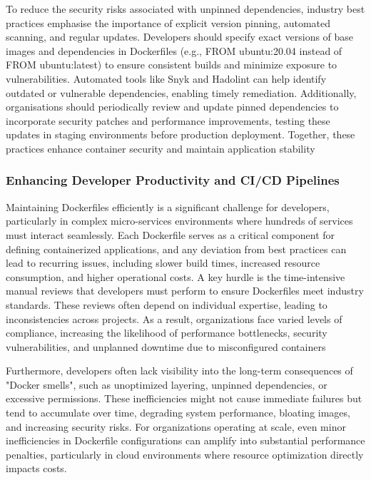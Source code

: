 To reduce the security risks associated with unpinned dependencies, industry best practices emphasise the importance of explicit version pinning, automated scanning, and regular updates. Developers should specify exact versions of base images and dependencies in Dockerfiles (e.g., FROM ubuntu:20.04 instead of FROM ubuntu:latest) to ensure consistent builds and minimize exposure to vulnerabilities. Automated tools like Snyk and Hadolint can help identify outdated or vulnerable dependencies, enabling timely remediation. Additionally, organisations should periodically review and update pinned dependencies to incorporate security patches and performance improvements, testing these updates in staging environments before production deployment. Together, these practices enhance container security and maintain application stability

\subsubsection{Enhancing Developer Productivity and CI/CD Pipelines}
Maintaining Dockerfiles efficiently is a significant challenge for developers, particularly in complex micro-services environments where hundreds of services must interact seamlessly. Each Dockerfile serves as a critical component for defining containerized applications, and any deviation from best practices can lead to recurring issues, including slower build times, increased resource consumption, and higher operational costs. A key hurdle is the time-intensive manual reviews that developers must perform to ensure Dockerfiles meet industry standards. These reviews often depend on individual expertise, leading to inconsistencies across projects. As a result, organizations face varied levels of compliance, increasing the likelihood of performance bottlenecks, security vulnerabilities, and unplanned downtime due to misconfigured containers

Furthermore, developers often lack visibility into the long-term consequences of "Docker smells", such as unoptimized layering, unpinned dependencies, or excessive permissions. These inefficiencies might not cause immediate failures but tend to accumulate over time, degrading system performance, bloating images, and increasing security risks. For organizations operating at scale, even minor inefficiencies in Dockerfile configurations can amplify into substantial performance penalties, particularly in cloud environments where resource optimization directly impacts costs.

